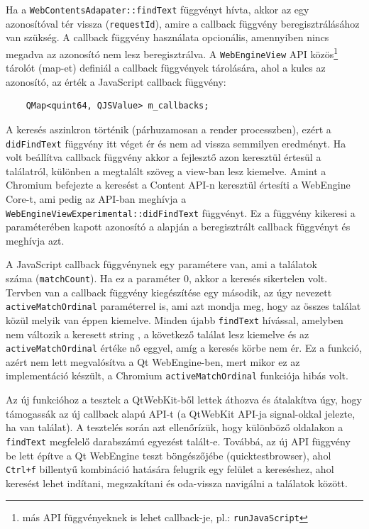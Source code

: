 \documentclass[12pt]{report}
\begin{document}
Ha a \texttt{WebContentsAdapater::findText} függvényt hívta, akkor az egy azonosítóval
tér vissza (\texttt{requestId}), amire a callback függvény beregisztrálásához van szükség.
A callback függvény használata opcionális, amennyiben nincs megadva az azonosító nem lesz
beregisztrálva. A \texttt{WebEngineView} API közös\footnote{más API függvényeknek is lehet
callback-je, pl.: \texttt{runJavaScript}} tárolót (map-et) definiál a callback függvények
tárolására, ahol a kulcs az azonosító, az érték a JavaScript callback függvény:
\begin{verbatim}
    QMap<quint64, QJSValue> m_callbacks;
\end{verbatim}
A keresés aszinkron történik (párhuzamosan a render processzben), ezért a \\
\texttt{didFindText} függvény itt véget ér és nem ad vissza semmilyen eredményt. Ha volt
beállítva callback függvény akkor a fejlesztő azon keresztül értesül a találatról, különben
a megtalált szöveg a view-ban lesz kiemelve. Amint a Chromium befejezte a keresést a
Content API-n keresztül értesíti a WebEngine Core-t, ami pedig az API-ban meghívja a
\texttt{WebEngineViewExperimental::didFindText} függvényt. Ez a függvény kikeresi a
paraméterében kapott azonosító a alapján a beregisztrált callback függvényt és meghívja azt.

A JavaScript callback függvénynek egy paramétere van, ami a találatok \\
száma (\texttt{matchCount}). Ha ez a paraméter 0, akkor a keresés sikertelen volt.
Tervben van a callback függvény kiegészítése egy második, az úgy nevezett \\
\texttt{activeMatchOrdinal} paraméterrel is, ami azt mondja meg, hogy az összes találat
közül melyik van éppen kiemelve. Minden újabb \texttt{findText} hívással, amelyben nem
változik a keresett string , a következő találat lesz kiemelve és az \\
\texttt{activeMatchOrdinal} értéke nő eggyel, amíg a keresés körbe nem ér.
Ez a funkció, azért nem lett megvalósítva a Qt WebEngine-ben, mert mikor
ez az implementáció készült, a Chromium \texttt{activeMatchOrdinal} funkciója hibás volt.

Az új funkcióhoz a tesztek a QtWebKit-ből lettek áthozva és átalakítva úgy, hogy
támogassák az új callback alapú API-t (a QtWebKit API-ja signal-okkal jelezte, ha van
találat). A tesztelés során azt ellenőrízük, hogy különböző oldalakon a \texttt{findText}
megfelelő darabszámú egyezést talált-e. Továbbá, az új API függvény be lett építve a
Qt WebEngine teszt böngészőjébe (quicktestbrowser), ahol \texttt{Ctrl+f} billentyű kombináció
hatására felugrik egy felület a kereséshez, ahol keresést lehet indítani, megszakítani és
oda-vissza navigálni a találatok között.
\end{document}
